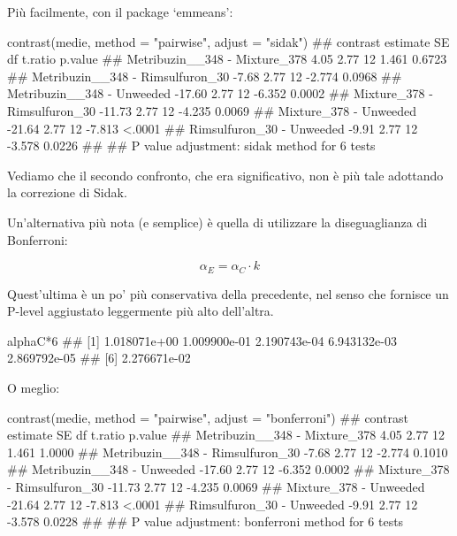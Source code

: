 \documentclass[a4paper,12pt,oneside]{book}
\newenvironment{Shaded}{}{}
\newcommand{\KeywordTok}[1]{#1}
\newcommand{\DataTypeTok}[1]{#1}
\newcommand{\DecValTok}[1]{#1}
\newcommand{\StringTok}[1]{#1}
\newcommand{\CommentTok}[1]{#1}
\newcommand{\OperatorTok}[1]{#1}
\newcommand{\NormalTok}[1]{#1}
\begin{document}
Più facilmente, con il package `emmeans':

\scriptsize

\begin{Shaded}
\begin{Highlighting}[]
\KeywordTok{contrast}\NormalTok{(medie, }\DataTypeTok{method =} \StringTok{"pairwise"}\NormalTok{, }\DataTypeTok{adjust =} \StringTok{"sidak"}\NormalTok{)}
\CommentTok{##  contrast                         estimate   SE df t.ratio p.value}
\CommentTok{##  Metribuzin__348 - Mixture_378        4.05 2.77 12  1.461  0.6723 }
\CommentTok{##  Metribuzin__348 - Rimsulfuron_30    -7.68 2.77 12 -2.774  0.0968 }
\CommentTok{##  Metribuzin__348 - Unweeded         -17.60 2.77 12 -6.352  0.0002 }
\CommentTok{##  Mixture_378 - Rimsulfuron_30       -11.73 2.77 12 -4.235  0.0069 }
\CommentTok{##  Mixture_378 - Unweeded             -21.64 2.77 12 -7.813  <.0001 }
\CommentTok{##  Rimsulfuron_30 - Unweeded           -9.91 2.77 12 -3.578  0.0226 }
\CommentTok{## }
\CommentTok{## P value adjustment: sidak method for 6 tests}
\end{Highlighting}
\end{Shaded}

\normalsize

Vediamo che il secondo confronto, che era significativo, non è più tale adottando la correzione di Sidak.

Un'alternativa più nota (e semplice) è quella di utilizzare la diseguaglianza di Bonferroni:

\[\alpha_E = \alpha_C \cdot k\]

Quest'ultima è un po' più conservativa della precedente, nel senso che fornisce un P-level aggiustato leggermente più alto dell'altra.

\begin{Shaded}
\begin{Highlighting}[]
\NormalTok{alphaC}\OperatorTok{*}\DecValTok{6}
\CommentTok{## [1] 1.018071e+00 1.009900e-01 2.190743e-04 6.943132e-03 2.869792e-05}
\CommentTok{## [6] 2.276671e-02}
\end{Highlighting}
\end{Shaded}

O meglio:

\begin{Shaded}
\begin{Highlighting}[]
\KeywordTok{contrast}\NormalTok{(medie, }\DataTypeTok{method =} \StringTok{"pairwise"}\NormalTok{, }\DataTypeTok{adjust =} \StringTok{"bonferroni"}\NormalTok{)}
\CommentTok{##  contrast                         estimate   SE df t.ratio p.value}
\CommentTok{##  Metribuzin__348 - Mixture_378        4.05 2.77 12  1.461  1.0000 }
\CommentTok{##  Metribuzin__348 - Rimsulfuron_30    -7.68 2.77 12 -2.774  0.1010 }
\CommentTok{##  Metribuzin__348 - Unweeded         -17.60 2.77 12 -6.352  0.0002 }
\CommentTok{##  Mixture_378 - Rimsulfuron_30       -11.73 2.77 12 -4.235  0.0069 }
\CommentTok{##  Mixture_378 - Unweeded             -21.64 2.77 12 -7.813  <.0001 }
\CommentTok{##  Rimsulfuron_30 - Unweeded           -9.91 2.77 12 -3.578  0.0228 }
\CommentTok{## }
\CommentTok{## P value adjustment: bonferroni method for 6 tests}
\end{Highlighting}
\end{Shaded}
\end{document}
